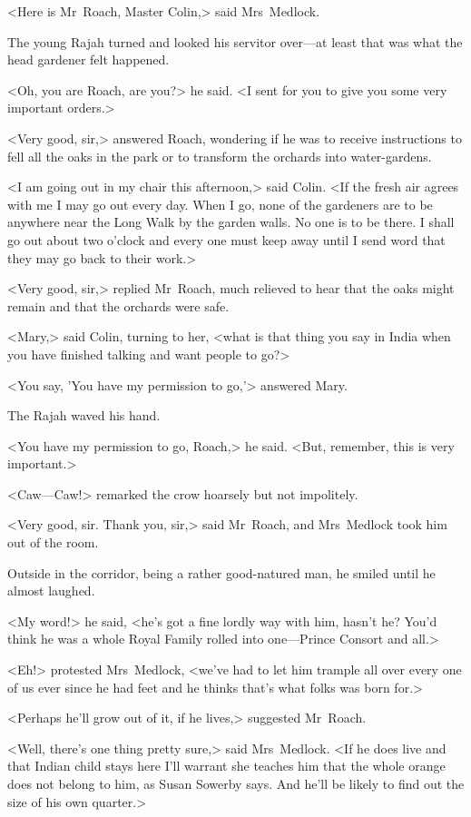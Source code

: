 <Here is Mr~Roach, Master Colin,> said Mrs~Medlock.

The young Rajah turned and looked his servitor over—at least that was what the head gardener felt happened.

<Oh, you are Roach, are you?> he said. <I sent for you to give you some very important orders.>

<Very good, sir,> answered Roach, wondering if he was to receive instructions to fell all the oaks in the park or to transform the orchards into water-gardens.

<I am going out in my chair this afternoon,> said Colin. <If the fresh air agrees with me I may go out every day. When I go, none of the gardeners are to be anywhere near the Long Walk by the garden walls. No one is to be there. I shall go out about two o'clock and every one must keep away until I send word that they may go back to their work.>

<Very good, sir,> replied Mr~Roach, much relieved to hear that the oaks might remain and that the orchards were safe.

<Mary,> said Colin, turning to her, <what is that thing you say in India when you have finished talking and want people to go?>

<You say, 'You have my permission to go,'> answered Mary.

The Rajah waved his hand.

<You have my permission to go, Roach,> he said. <But, remember, this is very important.>

<Caw—Caw!> remarked the crow hoarsely but not impolitely.

<Very good, sir. Thank you, sir,> said Mr~Roach, and Mrs~Medlock took him out of the room.

Outside in the corridor, being a rather good-natured man, he smiled until he almost laughed.

<My word!> he said, <he's got a fine lordly way with him, hasn't he? You'd think he was a whole Royal Family rolled into one—Prince Consort and all.>

<Eh!> protested Mrs~Medlock, <we've had to let him trample all over every one of us ever since he had feet and he thinks that's what folks was born for.>

<Perhaps he'll grow out of it, if he lives,> suggested Mr~Roach.

<Well, there's one thing pretty sure,> said Mrs~Medlock. <If he does live and that Indian child stays here I'll warrant she teaches him that the whole orange does not belong to him, as Susan Sowerby says. And he'll be likely to find out the size of his own quarter.>

